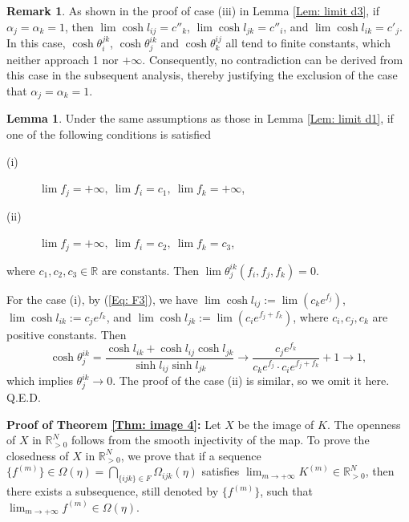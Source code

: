\documentclass[12pt]{amsart}
\theoremstyle{definition}
\newtheorem{lemma}[theorem]{Lemma}
\newtheorem{remark}[theorem]{Remark}
\def\qed{\hfill{Q.E.D.}\smallskip}
\begin{document}
\begin{remark}\label{Rmk: 4}
As shown in the proof of case (iii) in Lemma \ref{Lem: limit d3}, if $\alpha_j = \alpha_k = 1$, then $\lim\cosh l_{ij} = c''_k$, $\lim\cosh l_{jk} = c''_i$, and $\lim\cosh l_{ik} = c'_j$. 
In this case, $\cosh \theta^{jk}_i$, $\cosh \theta^{ik}_j$ and $\cosh \theta^{ij}_k$ all tend to finite constants, 
which neither approach 1 nor $+\infty$. 
Consequently, no contradiction can be derived from this case in the subsequent analysis, 
thereby justifying the exclusion of the case that $\alpha_j = \alpha_k = 1$.
\end{remark}


\begin{lemma}\label{Lem: limit d4}
Under the same assumptions as those in Lemma \ref{Lem: limit d1},
if one of the following conditions is satisfied
\begin{description}
\item[(i)] $\lim f_j=+\infty,\ \lim f_i=c_1,\ \lim f_k=+\infty$,
\item[(ii)] $\lim f_j=+\infty,\ \lim f_i=c_2,\ \lim f_k=c_3$,
\end{description}
where $c_1,c_2,c_3\in \mathbb{R}$ are constants.
Then $\lim\theta^{ik}_j(f_i,f_j,f_k)=0$.
\end{lemma}
\proof
For the case (i), by (\ref{Eq: F3}), we have
$\lim\cosh l_{ij}:=\lim(c_ke^{f_j})$,
$\lim\cosh l_{ik}:=c_je^{f_k}$, and $\lim\cosh l_{jk}:=\lim(c_ie^{f_j+f_k})$,
where $c_i,c_j,c_k$ are positive constants.
Then
\begin{equation*}
\cosh \theta^{ik}_j=\frac{\cosh l_{ik}+\cosh l_{ij}\cosh l_{jk}}{\sinh l_{ij}\sinh l_{jk}}\rightarrow
\frac{c_je^{f_k}}{c_ke^{f_j}\cdot c_ie^{f_j+f_k}}+1
\rightarrow 1,
\end{equation*}
which implies $\theta^{ik}_j\rightarrow 0$.
The proof of the case (ii) is similar, so we omit it here.
\qed

\noindent\textbf{Proof of Theorem \ref{Thm: image 4}:}
Let $X$ be the image of $K$.
The openness of $X$ in $\mathbb{R}^N_{>0}$ follows from the smooth injectivity of the map.
To prove the closedness of $X$ in $\mathbb{R}^N_{>0}$, we prove that if a sequence $\{f^{(m)}\}\in\Omega(\eta)=\bigcap_{\{ijk\}\in F}\Omega_{ijk}(\eta)$ satisfies $\lim_{m\rightarrow +\infty}K^{(m)}\in \mathbb{R}^N_{>0}$, then there exists a subsequence,
still denoted by $\{f^{(m)}\}$, such that $\lim_{m\rightarrow +\infty}f^{(m)}\in\Omega(\eta)$.
\end{document}
